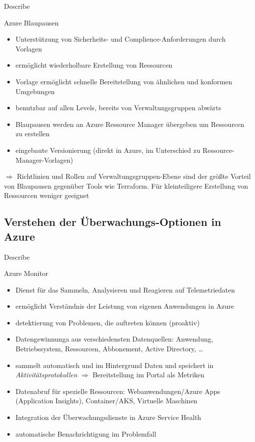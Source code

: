 \documentclass{scrartcl}
\newenvironment{flashcard}[2][]{%
    #1
    \vfill
    \centerline{\Large{#2}}
    \vfill
\newpage
}
{\newpage}
\newcommand{\subsectioncard}[1]{
    \vspace*{\stretch{1}}
    \subsection{#1}
    \vspace*{\stretch{1}}
    \pagebreak
}
\begin{document}
    \begin{flashcard}[Describe]{Azure Blaupausen}
        \begin{itemize}
            \item Unterstützung von Sicherheits- und Complience-Anforderungen durch Vorlagen
            \item ermöglicht wiederholbare Erstellung von Ressourcen
            \item Vorlage ermöglicht schnelle Bereitstellung von ähnlichen und konformen Umgebungen
            \item benutzbar auf allen Levels, bereits von Verwaltungsgruppen abwärts
            \item Blaupausen werden an Azure Ressource Manager übergeben um Ressourcen zu erstellen
            \item eingebaute Versionierung (direkt in Azure, im Unterschied zu Ressource-Manager-Vorlagen)
        \end{itemize}
        $\Rightarrow$ Richtlinien und Rollen auf Verwaltungsgruppen-Ebene sind der größte Vorteil von Blaupausen gegenüber Tools wie Terraform.
        Für kleinteiligere Erstellung von Ressourcen weniger geeignet

    \end{flashcard}

    \subsectioncard{Verstehen der Überwachungs-Optionen in Azure}

    \begin{flashcard}[Describe]{Azure Monitor}
        \begin{itemize}
            \item Dienst für das Sammeln, Analysieren und Reagieren auf Telemetriedaten
            \item ermöglicht Verständnis der Leistung von eigenen Anwendungen in Azure
            \item detektierung von Problemen, die auftreten können (proaktiv)
            \item Datengewinnunga aus verschiedensten Datenquellen:\newline
            Anwendung, Betriebssystem, Ressourcen, Abbonement, Active Directory, \ldots
            \item sammelt automatisch und im Hintergrund Daten und speichert in \emph{Aktivitätsprotokollen}\newline
            $\Rightarrow$ Bereitstellung im Portal als Metriken
            \item Datenabruf für spezielle Ressourcen: Webanwendungen/Azure Apps (Application Insights), Container/AKS, Virtuelle Maschinen
            \item Integration der Überwachungsdienste in Azure Service Health
            \item automatische Benachrichtigung im Problemfall
        \end{itemize}

    \end{flashcard}
\end{document}
